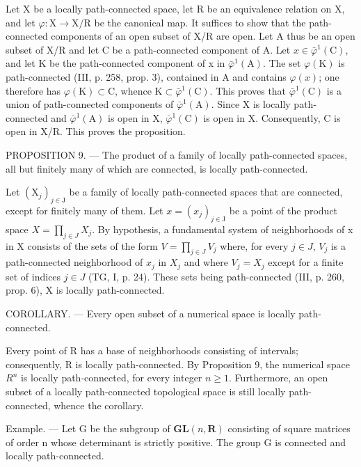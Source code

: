 Let X be a locally path-connected space, let R be an equivalence relation on X, and let \(\varphi\colon\mathrm{X}\to\mathrm{X}/\mathrm{R}\) be the canonical map. It suffices to show that the path-connected components of an open subset of X/R are open. Let A thus be an open subset of X/R and let C be a path-connected component of A. Let \(x\in\bar{\varphi}^{1}(\mathrm{C})\), and let K be the path-connected component of x in \(\bar{\varphi}^{1}(\mathrm{A})\). The set \(\varphi(\mathrm{K})\) is path-connected (III, p. 258, prop. 3), contained in A and contains \(\varphi(x)\); one therefore has \(\varphi(\mathrm{K})\subset\mathrm{C}\), whence \(\mathrm{K}\subset\bar{\varphi}^{1}(\mathrm{C})\). This proves that \(\bar{\varphi}^{1}(\mathrm{C})\) is a union of path-connected components of \(\bar{\varphi}^{1}(\mathrm{A})\). Since X is locally path-connected and \(\bar{\varphi}^{1}(\mathrm{A})\) is open in X, \(\bar{\varphi}^{1}(\mathrm{C})\) is open in X. Consequently, C is open in X/R. This proves the proposition.

PROPOSITION 9. --- The product of a family of locally path-connected spaces, all but finitely many of which are connected, is locally path-connected.

Let \((\mathrm{X}_{j})_{j\in\mathrm{J}}\) be a family of locally path-connected spaces that are connected, except for finitely many of them. Let \(x=(x_{j})_{j\in\mathrm{J}}\) be a point of the product space \(X=\prod_{j\in J}X_{j}\). By hypothesis, a fundamental system of neighborhoods of x in X consists of the sets of the form \(V=\prod_{j\in J}V_{j}\) where, for every \(j\in J\), \(V_{j}\) is a path-connected neighborhood of \(x_{j}\) in \(X_{j}\) and where \(V_{j}=X_{j}\) except for a finite set of indices \(j\in J\) (TG, I, p. 24). These sets being path-connected (III, p. 260, prop. 6), X is locally path-connected.

COROLLARY. --- Every open subset of a numerical space is locally path-connected.

Every point of R has a base of neighborhoods consisting of intervals; consequently, R is locally path-connected. By Proposition 9, the numerical space \(R^{n}\) is locally path-connected, for every integer \(n \geqslant 1\). Furthermore, an open subset of a locally path-connected topological space is still locally path-connected, whence the corollary.

Example. --- Let G be the subgroup of \(\mathbf{GL}(n,\mathbf{R})\) consisting of square matrices of order n whose determinant is strictly positive. The group G is connected and locally path-connected.


